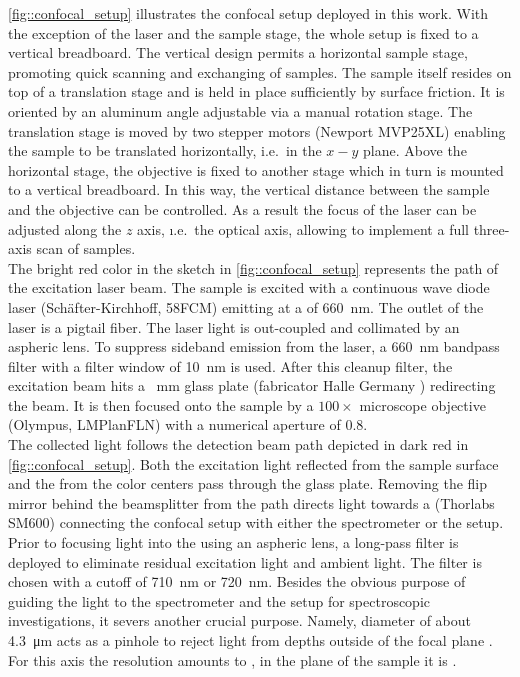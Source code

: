 		\autoref{fig::confocal_setup} illustrates the confocal setup deployed in this work.
		With the exception of the laser and the sample stage, the whole setup is fixed to a vertical breadboard.
		The vertical design permits a horizontal sample stage, promoting quick scanning and exchanging of samples.
		The sample itself resides on top of a translation stage and is held in place sufficiently by surface friction.
		It is oriented by an aluminum angle adjustable via a manual rotation stage.
		The translation stage is moved by two stepper motors (Newport MVP25XL) enabling the sample to be translated horizontally, i.e.\ in the $x-y$ plane.
		Above the horizontal stage, the objective is fixed to another stage which in turn is mounted to a vertical breadboard.
		In this way, the vertical distance between the sample and the objective can be controlled. As a result the focus of the laser can be adjusted along the $z$ axis, \i.e.\ the optical axis, allowing to implement a full three-axis scan of samples.
		\\
		The bright red color in the sketch in \autoref{fig::confocal_setup} represents the path of the excitation laser beam.
		The sample is excited with a continuous wave diode laser (Sch\"after-Kirchhoff, 58FCM) emitting at a \wl of \SI{660}{\nano\meter}.
		The outlet of the laser is a pigtail fiber.
		The laser light is out-coupled and collimated by an aspheric lens.
		To suppress sideband emission from the laser, a \SI{660}{\nm} bandpass filter with a filter window of \SI{10}{\nm} is used.
		After this cleanup filter, the excitation beam hits a \SI{}{\milli\meter} glass plate (fabricator Halle Germany ) redirecting the beam. It is then focused onto the sample by a $100 \times$ microscope objective (Olympus, LMPlanFLN) with a numerical aperture of $0.8$.
		\\
		The collected light follows the detection beam path depicted in dark red in \autoref{fig::confocal_setup}.
		Both the excitation light reflected from the sample surface and the \fl from the color centers pass through the glass plate.
		Removing the flip mirror behind the beamsplitter from the path directs light towards a \smf (Thorlabs SM600) connecting the confocal setup with either the spectrometer or the \hbt setup. Prior to focusing light into the \smf using an aspheric lens, a long-pass filter is deployed to eliminate residual excitation light and ambient light.
		The filter is chosen with a cutoff \wl of \SI{710}{\nm} or \SI{720}{\nm}.
		Besides the obvious purpose of guiding the \pl light to the spectrometer and the \HBT setup for spectroscopic investigations, it severs another crucial purpose. Namely, diameter of about \SI{4.3}{\micro\meter} acts as a pinhole to reject \pl light from depths outside of the focal plane \cite{Santori2010}.
		For this axis the resolution amounts to , in the plane of the sample it is .

